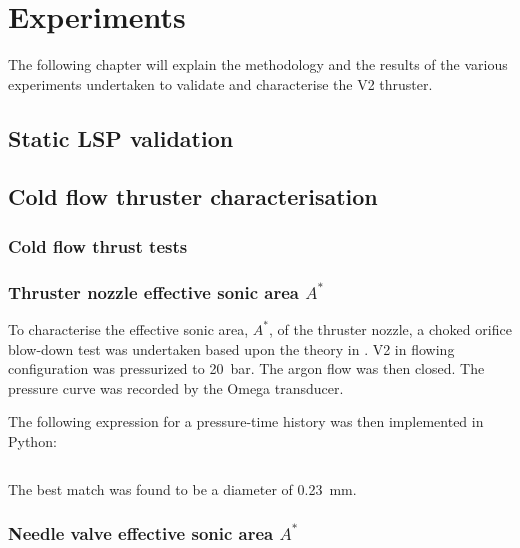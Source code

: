 \chapter{Experiments}

    The following chapter will explain the methodology and the results of the various experiments undertaken to validate and characterise the V2 thruster.

    \section{Static LSP validation}


    \section{Cold flow thruster characterisation}

        \subsection{Cold flow thrust tests}

        \subsection{Thruster nozzle effective sonic area $A^*$}

            To characterise the effective sonic area, $A^*$, of the thruster nozzle, a choked orifice blow-down test was undertaken based upon the theory in \textcite{saadCompressibleFluidFlow}. V2 in flowing configuration was pressurized to \qty{20}{bar}. The argon flow was then closed. The pressure curve was recorded by the Omega  transducer.
            



            The following expression for a pressure-time history  was then implemented in Python:

            \[
            
            \]

            The best match was found to be a diameter of \qty{0.23}{mm}.



        \subsection{Needle valve effective sonic area $A^*$}

